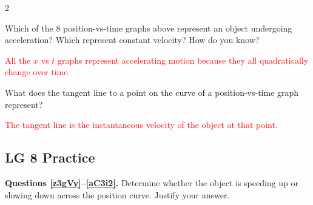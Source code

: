 \documentclass[answers]{exam}
\begin{document}
\begin{questions}
\begin{multicols}{2}
\begin{parts}
\end{parts}

\end{multicols}

\question
Which of the 8 position-vs-time graphs above represent an object undergoing acceleration? Which represent constant velocity? How do you know? 

\ifprintanswers
\textcolor{red}{All the $x$ vs $t$ graphs represent accelerating motion because they all quadratically change over time.}
\else
\fillwithlines{21mm}
\fi

\question
What does the tangent line to a point on the curve of a position-vs-time graph represent?

\ifprintanswers
\textcolor{red}{The tangent line is the instantaneous velocity of the object at that point.}
\else
\fillwithlines{21mm}
\fi

\end{questions}

\clearpage

\subsection*{LG 8 Practice}

\textbf{Questions \ref{z3gVy}--\ref{aC3i2}.} Determine whether the object is speeding up or slowing down across the position curve. Justify your answer.
\end{document}
